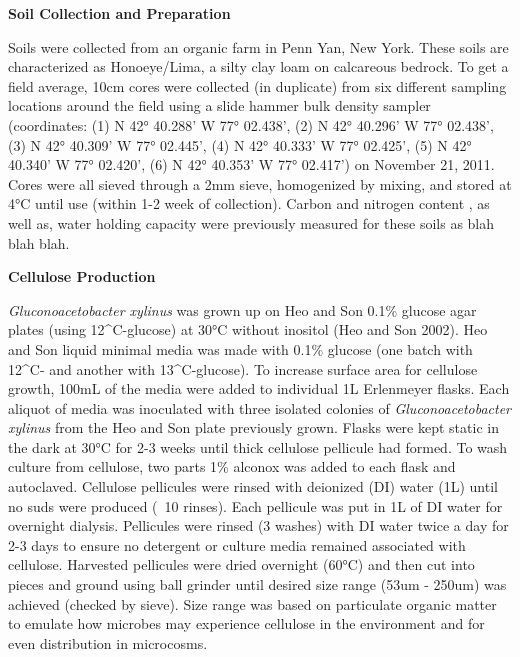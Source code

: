 \textbf{Soil Collection and Preparation}



Soils were collected from an organic farm in Penn Yan, New York.  These soils are characterized as Honoeye/Lima, a silty clay loam on calcareous bedrock.  To get a field average, 10cm cores were collected (in duplicate) from six different sampling locations around the field using a slide hammer bulk density sampler (coordinates: (1) N 42° 40.288’ W 77° 02.438’, (2) N 42° 40.296’ W 77° 02.438’, (3) N 42° 40.309’ W 77° 02.445’, (4) N 42° 40.333’ W 77° 02.425’, (5) N 42° 40.340’ W 77° 02.420’, (6) N 42° 40.353’ W 77° 02.417’) on November 21, 2011.   Cores were all sieved through a 2mm sieve, homogenized by mixing, and stored at 4°C until use (within 1-2 week of collection).  Carbon and nitrogen content , as well as, water holding capacity were previously measured for these soils as blah blah blah.     



\textbf{Cellulose Production}



\textit{Gluconoacetobacter xylinus} was grown up on Heo and Son 0.1\% glucose agar plates (using 12^{C}-glucose) at 30°C without inositol (Heo and Son 2002).  Heo and Son liquid minimal media was made with 0.1\% glucose (one batch with 12^{C}- and another with 13^{C}-glucose).  To increase surface area for cellulose growth, 100mL of the media were added to individual 1L Erlenmeyer flasks.  Each aliquot of media was inoculated with three isolated colonies of \textit{Gluconoacetobacter xylinus} from the Heo and Son plate previously grown.  Flasks were kept static in the dark at 30°C for 2-3 weeks until thick cellulose pellicule had formed.  To wash culture from cellulose, two parts 1\% alconox was added to each flask and autoclaved.  Cellulose pellicules were rinsed with deionized (DI) water (1L) until no suds were produced (~10 rinses).  Each pellicule was put in 1L of DI water for overnight dialysis.  Pellicules were rinsed (3 washes) with DI water twice a day for 2-3 days to ensure no detergent or culture media remained associated with cellulose.  Harvested pellicules were dried overnight (60°C) and then cut into pieces and ground using ball grinder until desired size range (53um - 250um) was achieved (checked by sieve).  Size range was based on particulate organic matter to emulate how microbes may experience cellulose in the environment and for even distribution in microcosms.                    



